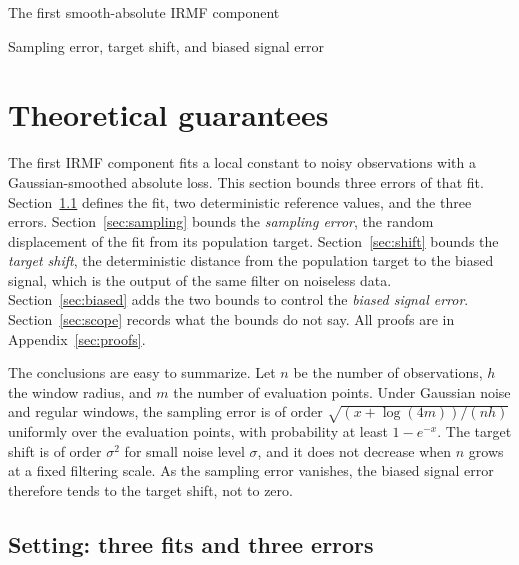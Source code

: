 \documentclass[11pt]{article}
\theoremstyle{definition}
\begin{document}
\begin{center}
  {\Large The first smooth-absolute IRMF component\par}
  \vspace{5pt}
  {\large Sampling error, target shift, and biased signal error\par}
\end{center}

\setcounter{section}{3}
\section{Theoretical guarantees}

The first IRMF component fits a local constant to noisy observations with a
Gaussian-smoothed absolute loss.  This section bounds three errors of that
fit.  Section~\ref{sec:setting} defines the fit, two deterministic reference
values, and the three errors.  Section~\ref{sec:sampling} bounds the
\emph{sampling error}, the random displacement of the fit from its population
target.  Section~\ref{sec:shift} bounds the \emph{target shift}, the
deterministic distance from the population target to the biased signal, which
is the output of the same filter on noiseless data.
Section~\ref{sec:biased} adds the two bounds to control the \emph{biased signal
error}.  Section~\ref{sec:scope} records what the bounds do not say.  All
proofs are in Appendix~\ref{sec:proofs}.

The conclusions are easy to summarize.  Let \(n\) be the number of
observations, \(h\) the window radius, and \(m\) the number of evaluation
points.  Under Gaussian noise and regular windows, the sampling error is of
order \(\sqrt{(x+\log(4m))/(nh)}\) uniformly over the evaluation points, with
probability at least \(1-e^{-x}\).  The target shift is of order \(\sigma^2\)
for small noise level \(\sigma\), and it does not decrease when \(n\) grows at
a fixed filtering scale.  As the sampling error vanishes, the biased signal
error therefore tends to the target shift, not to zero.

\subsection{Setting: three fits and three errors}\label{sec:setting}
\end{document}
